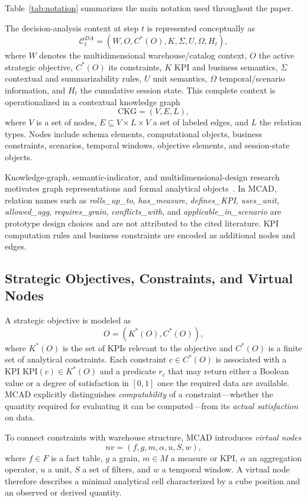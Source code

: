 \documentclass[journal]{IEEEtran}
\begin{document}
Table~\ref{tab:notation} summarizes the main notation used throughout the paper.


The decision-analysis context at step $t$ is represented conceptually as
\[
\mathcal C_t^{DA}=(W,O,C^*(O),K,\Sigma,U,\Omega,H_t),
\]
where $W$ denotes the multidimensional warehouse/catalog context, $O$ the active strategic objective, $C^*(O)$ its constraints, $K$ KPI and business semantics, $\Sigma$ contextual and summarizability rules, $U$ unit semantics, $\Omega$ temporal/scenario information, and $H_t$ the cumulative session state. This complete context is operationalized in a contextual knowledge graph
\[
\mathrm{CKG}=(V,E,L),
\]
where $V$ is a set of nodes, $E\subseteq V\times L\times V$ a set of labeled edges, and $L$ the relation types. Nodes include schema elements, computational objects, business constraints, scenarios, temporal windows, objective elements, and session-state objects.

Knowledge-graph, semantic-indicator, and multidimensional-design research motivates graph representations and formal analytical objects~\cite{HoganKGSurvey2021,DiamantiniKPISurvey2025,RomeroAbello2010}. In MCAD, relation names such as \textit{rolls\_up\_to}, \textit{has\_measure}, \textit{defines\_KPI}, \textit{uses\_unit}, \textit{allowed\_agg}, \textit{requires\_grain}, \textit{conflicts\_with}, and \textit{applicable\_in\_scenario} are prototype design choices and are not attributed to the cited literature. KPI computation rules and business constraints are encoded as additional nodes and edges.

\subsection{Strategic Objectives, Constraints, and Virtual Nodes}

A strategic objective is modeled as
\[
O=(K^*(O),C^*(O)),
\]
where $K^*(O)$ is the set of KPIs relevant to the objective and $C^*(O)$ is a finite set of analytical constraints. Each constraint $c\in C^*(O)$ is associated with a KPI $\mathrm{KPI}(c)\in K^*(O)$ and a predicate $r_c$ that may return either a Boolean value or a degree of satisfaction in $[0,1]$ once the required data are available. MCAD explicitly distinguishes \emph{computability} of a constraint---whether the quantity required for evaluating it can be computed---from its \emph{actual satisfaction} on data.

To connect constraints with warehouse structure, MCAD introduces \emph{virtual nodes}
\[
nv=(f,g,m,\alpha,u,S,w),
\]
where $f\in F$ is a fact table, $g$ a grain, $m\in M$ a measure or KPI, $\alpha$ an aggregation operator, $u$ a unit, $S$ a set of filters, and $w$ a temporal window. A virtual node therefore describes a minimal analytical cell characterized by a cube position and an observed or derived quantity.
\end{document}
